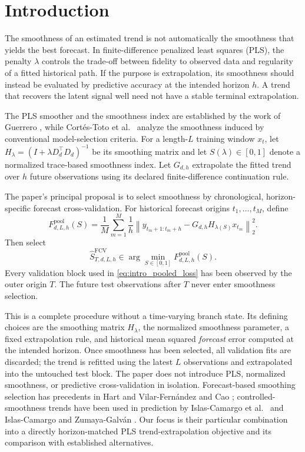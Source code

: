 \section{Introduction}

The smoothness of an estimated trend is not automatically the
smoothness that yields the best forecast. In finite-difference
penalized least squares (PLS), the penalty $\lambda$ controls the
trade-off between fidelity to observed data and regularity of a
fitted historical path. If the purpose is extrapolation, its
smoothness should instead be evaluated by predictive accuracy at
the intended horizon $h$. A trend that recovers the latent signal
well need not have a stable terminal extrapolation.

The PLS smoother and the smoothness index are established by the
work of Guerrero \cite{guerrero2007penalized,guerrero2008smoothness},
while Cort\'es-Toto et al.\ \cite{cortes2017smoothness} analyze the
smoothness induced by conventional model-selection criteria.
For a length-$L$ training window $x_t$, let
$H_\lambda=(I+\lambda D_d^\top D_d)^{-1}$ be its smoothing matrix
and let $S(\lambda)\in[0,1]$ denote a normalized trace-based
smoothness index. Let $G_{d,h}$ extrapolate the fitted trend over
$h$ future observations using its declared finite-difference
continuation rule.

The paper's principal proposal is to select smoothness by
chronological, horizon-specific forecast cross-validation. For
historical forecast origins $t_1,\ldots,t_M$, define
\begin{equation}
\label{eq:intro_pooled_loss}
F^{\mathrm{pool}}_{d,L,h}(S)
=
\frac1M\sum_{m=1}^M\frac1h
\left\|y_{t_m+1:t_m+h}
-G_{d,h}H_{\lambda(S)}x_{t_m}\right\|_2^2.
\end{equation}
Then select
\begin{equation}
\label{eq:intro_pooled_choice}
\widehat S^{\mathrm{FCV}}_{T,d,L,h}
\in\arg\min_{S\in[0,1]}
F^{\mathrm{pool}}_{d,L,h}(S).
\end{equation}
Every validation block used in \cref{eq:intro_pooled_loss}
has been observed by the outer origin $T$. The future test
observations after $T$ never enter smoothness selection.

This is a complete procedure without a time-varying branch state.
Its defining choices are the smoothing matrix $H_\lambda$, the
normalized smoothness parameter, a fixed extrapolation rule, and
historical mean squared \emph{forecast} error computed at the
intended horizon. Once smoothness has been selected, all validation
fits are discarded; the trend is refitted using the latest
$L$ observations and extrapolated into the untouched test block.
The paper does not introduce PLS, normalized smoothness, or
predictive cross-validation in isolation. Forecast-based smoothing
selection has precedents in Hart \cite{hart1994tscv} and
Vilar-Fern\'andez and Cao \cite{vilar2007nonparametric};
controlled-smoothness trends have been used in prediction by
Islas-Camargo et al.\ \cite{islas2019remittances} and
Islas-Camargo and Zumaya-Galv\'an \cite{islas2025exchange}.
Our focus is their particular combination into a directly
horizon-matched PLS trend-extrapolation objective and
its comparison with established alternatives.

